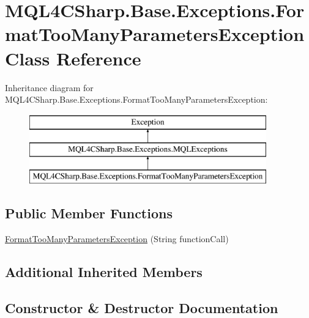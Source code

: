 \hypertarget{class_m_q_l4_c_sharp_1_1_base_1_1_exceptions_1_1_format_too_many_parameters_exception}{}\section{M\+Q\+L4\+C\+Sharp.\+Base.\+Exceptions.\+Format\+Too\+Many\+Parameters\+Exception Class Reference}
\label{class_m_q_l4_c_sharp_1_1_base_1_1_exceptions_1_1_format_too_many_parameters_exception}
Inheritance diagram for M\+Q\+L4\+C\+Sharp.\+Base.\+Exceptions.\+Format\+Too\+Many\+Parameters\+Exception\+:\begin{figure}[H]
\begin{center}
\leavevmode
\includegraphics[height=3.000000cm]{class_m_q_l4_c_sharp_1_1_base_1_1_exceptions_1_1_format_too_many_parameters_exception}
\end{center}
\end{figure}
\subsection*{Public Member Functions}
\begin{DoxyCompactItemize}
\item 
\hyperlink{class_m_q_l4_c_sharp_1_1_base_1_1_exceptions_1_1_format_too_many_parameters_exception_a841023573f5985d68572b4d31d49d6c1}{Format\+Too\+Many\+Parameters\+Exception} (String function\+Call)
\end{DoxyCompactItemize}
\subsection*{Additional Inherited Members}


\subsection{Constructor \& Destructor Documentation}
